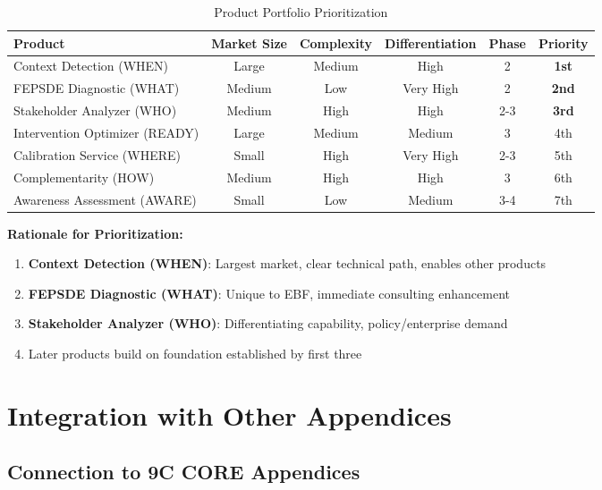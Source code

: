 \begin{table}[htbp]
\centering
\caption{Product Portfolio Prioritization}
\label{tab:vvv-portfolio}
\renewcommand{\arraystretch}{1.3}
\begin{tabular}{@{}lccccc@{}}
\toprule
\textbf{Product} & \textbf{Market Size} & \textbf{Complexity} & \textbf{Differentiation} & \textbf{Phase} & \textbf{Priority} \\
\midrule
Context Detection (WHEN) & Large & Medium & High & 2 & \textbf{1st} \\
FEPSDE Diagnostic (WHAT) & Medium & Low & Very High & 2 & \textbf{2nd} \\
Stakeholder Analyzer (WHO) & Medium & High & High & 2-3 & \textbf{3rd} \\
Intervention Optimizer (READY) & Large & Medium & Medium & 3 & 4th \\
Calibration Service (WHERE) & Small & High & Very High & 2-3 & 5th \\
Complementarity (HOW) & Medium & High & High & 3 & 6th \\
Awareness Assessment (AWARE) & Small & Low & Medium & 3-4 & 7th \\
\bottomrule
\end{tabular}
\end{table}

\textbf{Rationale for Prioritization:}

\begin{enumerate}
\item \textbf{Context Detection (WHEN)}: Largest market, clear technical path, enables other products
\item \textbf{FEPSDE Diagnostic (WHAT)}: Unique to EBF, immediate consulting enhancement
\item \textbf{Stakeholder Analyzer (WHO)}: Differentiating capability, policy/enterprise demand
\item Later products build on foundation established by first three
\end{enumerate}


\section{Integration with Other Appendices}
\label{sec:vvv3-integration}

\subsection{Connection to 9C CORE Appendices}

